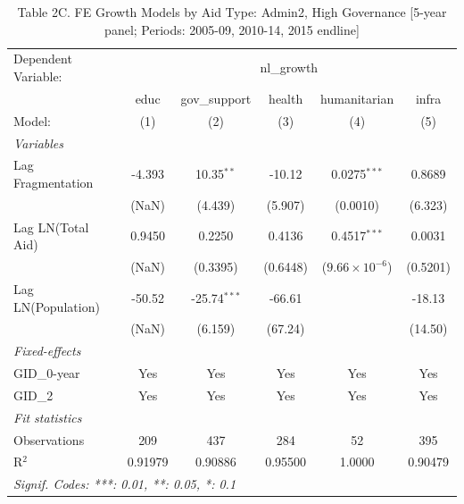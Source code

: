 
\begin{table}[H]
   \caption{Table 2C. FE Growth Models by Aid Type: Admin2, High Governance [5-year panel; Periods: 2005-09, 2010-14, 2015 endline]}
   \centering
   \begin{tabular}{lccccc}
      \tabularnewline \midrule \midrule
      Dependent Variable: & \multicolumn{5}{c}{nl\_growth}\\
                         & educ    & gov\_support   & health   & humanitarian            & infra \\   
      Model:             & (1)     & (2)            & (3)      & (4)                     & (5)\\  
      \midrule
      \emph{Variables}\\
      Lag Fragmentation  & -4.393  & 10.35$^{**}$   & -10.12   & 0.0275$^{***}$          & 0.8689\\   
                         & (NaN)   & (4.439)        & (5.907)  & (0.0010)                & (6.323)\\   
      Lag LN(Total Aid)  & 0.9450  & 0.2250         & 0.4136   & 0.4517$^{***}$          & 0.0031\\   
                         & (NaN)   & (0.3395)       & (0.6448) & ($9.66\times 10^{-6}$)  & (0.5201)\\   
      Lag LN(Population) & -50.52  & -25.74$^{***}$ & -66.61   &                         & -18.13\\   
                         & (NaN)   & (6.159)        & (67.24)  &                         & (14.50)\\   
      \midrule
      \emph{Fixed-effects}\\
      GID\_0-year        & Yes     & Yes            & Yes      & Yes                     & Yes\\  
      GID\_2             & Yes     & Yes            & Yes      & Yes                     & Yes\\  
      \midrule
      \emph{Fit statistics}\\
      Observations       & 209     & 437            & 284      & 52                      & 395\\  
      R$^2$              & 0.91979 & 0.90886        & 0.95500  & 1.0000                  & 0.90479\\  
      \midrule \midrule
      \multicolumn{6}{l}{\emph{Signif. Codes: ***: 0.01, **: 0.05, *: 0.1}}\\
   \end{tabular}
\end{table}




